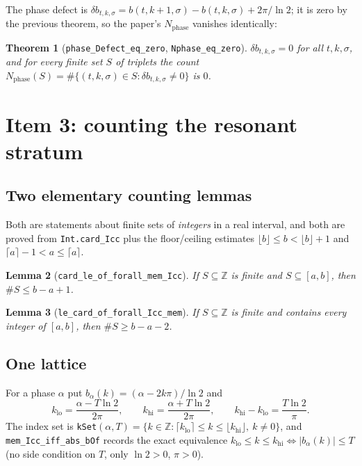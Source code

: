 \documentclass[11pt,a4paper]{article}
\newcommand{\Z}{\mathbb{Z}}
\newcommand{\lb}{\_\allowbreak}
\newcommand{\code}[1]{\texttt{#1}}
\newtheorem{theorem}{Theorem}[section]
\newtheorem{lemma}[theorem]{Lemma}
\theoremstyle{definition}
\theoremstyle{remark}
\begin{document}
The phase defect is $\delta b_{t,k,\sigma}=b(t,k+1,\sigma)-b(t,k,\sigma)+2\pi/\ln2$; it is
zero by the previous theorem, so the paper's $N_{\mathrm{phase}}$ vanishes identically:

\begin{theorem}[\code{phase\lb Defect\lb eq\lb zero}, \code{Nphase\lb eq\lb zero}]
$\delta b_{t,k,\sigma}=0$ for all $t,k,\sigma$, and for every finite set $S$ of triplets the
count $N_{\mathrm{phase}}(S)=\#\{(t,k,\sigma)\in S:\delta b_{t,k,\sigma}\neq0\}$ is $0$.
\end{theorem}

\section{Item 3: counting the resonant stratum}\label{sec:item3}

\subsection{Two elementary counting lemmas}

Both are statements about finite sets of \emph{integers} in a real interval, and both are
proved from \code{Int.card\lb Icc} plus the floor/ceiling estimates
$\lfloor b\rfloor\le b<\lfloor b\rfloor+1$ and $\lceil a\rceil-1<a\le\lceil a\rceil$.

\begin{lemma}[\code{card\lb le\lb of\lb forall\lb mem\lb Icc}]
If $S\subseteq\Z$ is finite and $S\subseteq[a,b]$, then $\#S\le b-a+1$.
\end{lemma}
\begin{lemma}[\code{le\lb card\lb of\lb forall\lb Icc\lb mem}]
If $S\subseteq\Z$ is finite and contains every integer of $[a,b]$, then $\#S\ge b-a-2$.
\end{lemma}

\subsection{One lattice}

For a phase $\alpha$ put $b_\alpha(k)=(\alpha-2k\pi)/\ln2$ and
\[
  k_{\mathrm{lo}}=\frac{\alpha-T\ln2}{2\pi},\qquad
  k_{\mathrm{hi}}=\frac{\alpha+T\ln2}{2\pi},\qquad
  k_{\mathrm{hi}}-k_{\mathrm{lo}}=\frac{T\ln2}{\pi}.
\]
The index set is \code{kSet}$(\alpha,T)=\{k\in\Z:\lceil k_{\mathrm{lo}}\rceil\le k\le
\lfloor k_{\mathrm{hi}}\rfloor,\ k\neq0\}$, and \code{mem\lb Icc\lb iff\lb abs\lb bOf}
records the exact equivalence $k_{\mathrm{lo}}\le k\le k_{\mathrm{hi}}\iff|b_\alpha(k)|\le
T$ (no side condition on $T$, only $\ln2>0$, $\pi>0$).
\end{document}
